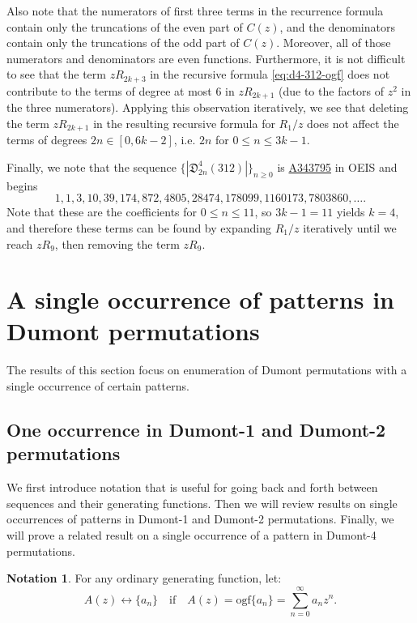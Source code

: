\documentclass[
final
]{dmtcs-episciences}
\theoremstyle{definition}
\newtheorem{notation}[theorem]{Notation}
\theoremstyle{remark}
\begin{document}
Also note that the numerators  of first three terms in the recurrence formula contain only the truncations of the even part of $C(z)$, and the denominators contain only the truncations of the odd part of $C(z)$. Moreover, all of those numerators and denominators are even functions. Furthermore, it is not difficult to see that the term $zR_{2k+3}$ in the recursive formula \eqref{eq:d4-312-ogf} does not contribute to the terms of degree at most 6 in $zR_{2k+1}$ (due to the factors of $z^2$ in the three numerators). Applying this observation iteratively, we see that deleting the term $zR_{2k+1}$ in the resulting recursive formula for $R_1/z$ does not affect the terms of degrees $2n\in[0,6k-2]$, i.e. $2n$ for $0\le n\le 3k-1$.

Finally, we note that the sequence $\{|\mathfrak{D}^4_{2n}(312)|\}_{n\ge 0}$ is \href{https://oeis.org/A343795}{A343795} in OEIS \cite{OEIS} and begins 
\[
1,1,3,10,39,174,872,4805,28474,178099,1160173,7803860,\dots .
\]
Note that these are the coefficients for $0\le n\le 11$, so $3k-1=11$ yields $k=4$, and therefore these terms can be found by expanding $R_1/z$ iteratively until we reach $zR_9$, then removing the term $zR_9$.




\section{A single occurrence of patterns in Dumont permutations}

The results of this section focus on enumeration of Dumont permutations with a single occurrence of certain patterns.

\subsection{One occurrence in Dumont-1 and Dumont-2 permutations}

We first introduce notation that is useful for going back and forth between sequences and their generating functions. Then we will review results on single occurrences of patterns in Dumont-1 and Dumont-2 permutations. Finally, we will prove a related result on a single occurrence of a pattern in Dumont-4 permutations.

\begin{notation}
For any ordinary generating function, let:
\[
A(z) \longleftrightarrow \{a_n\} \quad \text{if} \quad A(z) = \text{ogf}\{a_n\} = \sum_{n=0}^\infty a_n z^n.
\]
\end{notation}
\end{document}
